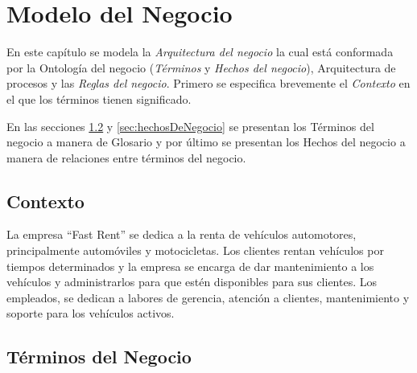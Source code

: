 \chapter{Modelo del Negocio}
\label{cap:reqSist}

En este capítulo se modela la {\em Arquitectura del negocio} la cual está conformada por la Ontología del negocio ({\em Términos} y {\em Hechos del negocio}), Arquitectura de procesos y las {\em Reglas del negocio}. Primero se especifica brevemente el {\em Contexto} en el que los términos tienen significado.

En las secciones \ref{sec:terminosDeNegocio} y \ref{sec:hechosDeNegocio} se presentan los Términos del negocio a manera de Glosario y por último se presentan los Hechos del negocio a manera de relaciones entre términos del negocio.

\section{Contexto}

La empresa ``Fast Rent'' se dedica a la renta de vehículos automotores, principalmente automóviles y motocicletas. Los clientes rentan vehículos por tiempos determinados y la empresa se encarga de dar mantenimiento a los vehículos y administrarlos para que estén disponibles para sus clientes. Los empleados, se dedican a labores de gerencia, atención a clientes, mantenimiento y soporte para los vehículos activos.

\section{Términos del Negocio}
\label{sec:terminosDeNegocio}

